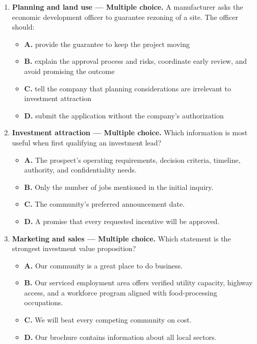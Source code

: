 \documentclass[11pt,letterpaper,oneside,openany]{book}
\begin{document}
\begin{enumerate}[leftmargin=*,itemsep=1.1em]
\begin{itemize}[leftmargin=1.7em]
\end{itemize}
\item \textbf{Planning and land use --- Multiple choice.} A manufacturer asks the economic development officer to guarantee rezoning of a site. The officer should:
\begin{itemize}[leftmargin=1.7em]
\item \textbf{A.} provide the guarantee to keep the project moving
\item \textbf{B.} explain the approval process and risks, coordinate early review, and avoid promising the outcome
\item \textbf{C.} tell the company that planning considerations are irrelevant to investment attraction
\item \textbf{D.} submit the application without the company's authorization
\end{itemize}
\item \textbf{Investment attraction --- Multiple choice.} Which information is most useful when first qualifying an investment lead?
\begin{itemize}[leftmargin=1.7em]
\item \textbf{A.} The prospect's operating requirements, decision criteria, timeline, authority, and confidentiality needs.
\item \textbf{B.} Only the number of jobs mentioned in the initial inquiry.
\item \textbf{C.} The community's preferred announcement date.
\item \textbf{D.} A promise that every requested incentive will be approved.
\end{itemize}
\item \textbf{Marketing and sales --- Multiple choice.} Which statement is the strongest investment value proposition?
\begin{itemize}[leftmargin=1.7em]
\item \textbf{A.} Our community is a great place to do business.
\item \textbf{B.} Our serviced employment area offers verified utility capacity, highway access, and a workforce program aligned with food-processing occupations.
\item \textbf{C.} We will beat every competing community on cost.
\item \textbf{D.} Our brochure contains information about all local sectors.
\end{itemize}

\end{enumerate}
\end{document}
